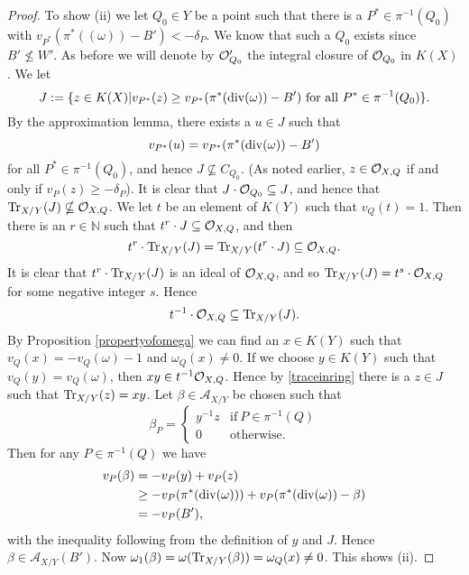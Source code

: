 \begin{proof}
    To show (ii) we let $Q_0\in Y$ be a point such that there is a $P^*\in \pi^{-1}(Q_0)$ with $v_{P^*}(\pi^*((\omega)) - B') < -\delta_P$.
    We know that such a $Q_0$ exists since $B' \nleq W'$.
    As before we will denote by ${\cal O}_{Q_0}'$ the integral closure of ${\cal O}_{Q_0}$ in $K(X)$.
    We let 
        \[
        J := \{ z\in K(X) | v_{P^*}(z) \geq v_{P^*}(\pi^*(\operatorname{div} (\omega)) - B')\ \text{for all}\ P^*\in \pi^{-1}(Q_0)\}.
        \]
    By the approximation lemma, there exists a $u\in J$ such that 
        \[
        v_{P^*}(u) = v_{P^*}(\pi^*(\operatorname{div} (\omega))-B')
        \]
    for all $P^*\in \pi^{-1}(Q_0)$, and hence $J\nsubseteq C_{Q_0}$.
    (As noted earlier, $z\in {\cal O}_{X,Q}$ if and only if $v_P(z) \geq -\delta_P$).
    It is clear that $J\cdot {\cal O}_{Q_0} \subseteq J$, and hence that $\operatorname{Tr}_{X/Y}(J) \nsubseteq {\cal O}_{X,Q}$.
    We let $t$ be an element of $K(Y)$ such that $v_Q(t) = 1$.
    Then there is an $r\in \mathbb N$ such that $t^r\cdot J \subseteq {\cal O}_{X,Q}$, and then 
        \[ 
        t^r\cdot \operatorname{Tr}_{X/Y}(J) = \operatorname{Tr}_{X/Y}(t^r\cdot J) \subseteq {\cal O}_{X,Q}.
        \]
    It is clear that $t^r\cdot \operatorname{Tr}_{X/Y} (J)$ is an ideal of ${\cal O}_{X,Q}$, and so $\operatorname{Tr}_{X/Y}(J) = t^s\cdot {\cal O}_{X,Q}$ for some negative integer $s$.
    Hence 
        \begin{equation}\label{traceinring}
        t^{-1}\cdot {\cal O}_{X,Q} \subseteq \operatorname{Tr}_{X/Y}(J).
        \end{equation}
    By Proposition \ref{propertyofomega} we can find an $x\in K(Y)$ such that $v_Q(x) = -v_Q(\omega) - 1$ and $\omega_Q(x) \neq 0$.
    If we choose $y\in K(Y)$ such that $v_Q(y) = v_Q(\omega)$, then $xy \in t^{-1}{\cal O}_{X,Q}$.
    Hence by \eqref{traceinring} there is a $z\in J$ such that $\operatorname{Tr}_{X/Y} (z) = xy$.
    Let $\beta \in \mathcal{A}_{X/Y}$ be chosen  such that 
        \begin{equation*}
        \beta_P =
            \begin{cases}
            y^{-1}z & \text{if}\ P\in \pi^{-1}(Q) \\
            0 & \text{otherwise}.
            \end{cases}
        \end{equation*}
    Then for any $P\in \pi^{-1}(Q)$ we have
        \begin{align*}
        v_P(\beta) & =  -v_P(y) + v_P(z) \\
        & \geq  -v_P(\pi^*(\operatorname{div} (\omega))) + v_P(\pi^*(\operatorname{div} (\omega)) - \beta) \\
        & =  -v_P(B'),
        \end{align*}
    with the inequality following from the definition of $y$ and $J$.
    Hence $\beta \in \mathcal{A}_{X/Y}(B')$.
    Now $\omega_1(\beta) = \omega(\operatorname{Tr}_{X/Y}(\beta)) = \omega_Q(x) \neq 0$.
    This shows (ii).
    

\end{proof}

